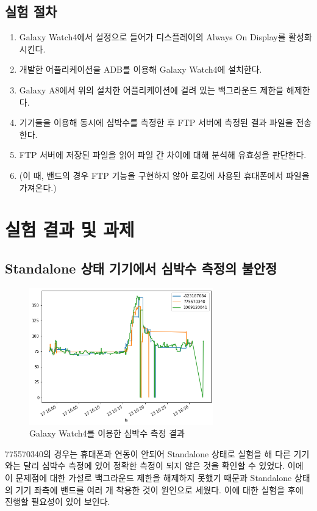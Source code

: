\documentclass[11pt]{article}
\begin{document}
    \subsection*{실험 절차}
    \hspace{0cm}
    \begin{enumerate}
        \item Galaxy Watch4에서 설정으로 들어가 디스플레이의 Always On Display를 활성화시킨다.
        \item 개발한 어플리케이션을 ADB를 이용해 Galaxy Watch4에 설치한다.
        \item Galaxy A8에서 위의 설치한 어플리케이션에 걸려 있는 백그라운드 제한을 해제한다.
        \item 기기들을 이용해 동시에 심박수를 측정한 후 FTP 서버에 측정된 결과 파일을 전송한다.
        \item FTP 서버에 저장된 파일을 읽어 파일 간 차이에 대해 분석해 유효성을 판단한다.
        \item[] \hspace{0.5cm}(이 때, 밴드의 경우 FTP 기능을 구현하지 않아 로깅에 사용된 휴대폰에서 파일을 가져온다.) 
    \end{enumerate}
    \newpage
    \section{실험 결과 및 과제}
    \subsection*{Standalone 상태 기기에서 심박수 측정의 불안정}
    \begin{figure}[!h]
        \centering
        \includegraphics[width=8cm]{output.png}
        \caption{Galaxy Watch4를 이용한 심박수 측정 결과}
    \end{figure}
    \noindent
    775570340의 경우는 휴대폰과 연동이 안되어 Standalone 상태로 실험을 해
    다른 기기와는 달리 심박수 측정에 있어 정확한 측정이 되지 않은 것을 확인할 수 있었다.
    이에 이 문제점에 대한 가설로 백그라운드 제한을 해제하지 못했기 때문과
    Standalone 상태의 기기 좌측에 밴드를 여러 개 착용한 것이 원인으로 세웠다.
    이에 대한 실험을 후에 진행할 필요성이 있어 보인다.
    
\end{document}
